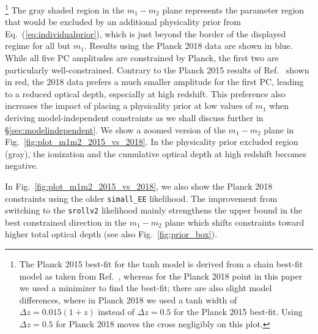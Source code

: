 \documentclass[prd,twocolumn,amsmath,amssymb,floatfix,superscriptaddress,nofootinbib]{revtex4-1}
\newcommand{\wh}[1]{\textcolor{blue}{#1}}
\begin{document}
%
\footnote{The Planck 2015 best-fit for the tanh model is derived from a chain best-fit model as taken from Ref.~\cite{Heinrich:2016ojb}, whereas for the Planck 2018 point in this paper we used a minimizer to find the best-fit; there are also slight model differences, where in Planck 2018 we used a tanh width of $\Delta z = 0.015(1+z)$ instead of $\Delta z = 0.5$ for the Planck 2015 best-fit. Using $\Delta z = 0.5$ for Planck 2018 moves the cross negligibly on this plot.}
%
%
%
%
The gray shaded region in the $m_1-m_2$ plane represents the parameter region that would be excluded by an additional 
physicality prior from Eq.~(\ref{eq:individualprior}),
which is just beyond the border of the displayed regime for all but $m_1$. Results using the Planck 2018 data are shown in blue. While all five PC amplitudes are  constrained by Planck, the first two are particularly well-constrained. Contrary to the Planck 2015 results of Ref.~\cite{Heinrich:2016ojb} shown in red, the 2018 data prefers a much smaller amplitude for the first PC, leading to a reduced optical depth, especially at high redshift.  
This preference also increases the impact of placing a physicality prior at low values of $m_1$ when deriving model-independent constraints as we shall discuss further in \S \ref{sec:modelindependent}.
We show a zoomed version of the $m_1-m_2$ plane in Fig.~\ref{fig:plot_m1m2_2015_vs_2018}.
In the physicality prior excluded region (gray), the ionization and the cumulative optical depth at high redshift becomes negative.

In Fig.~\ref{fig:plot_m1m2_2015_vs_2018}, we also show
the Planck 2018 constraints using the older \texttt{simall\_EE} likelihood.  The improvement 
from switching to the \texttt{srollv2} likelihood mainly strengthens the upper bound in the best constrained direction in the $m_1-m_2$ plane which shifts constraints toward higher total optical depth (see also Fig.~\ref{fig:prior_box}).




\end{document}
